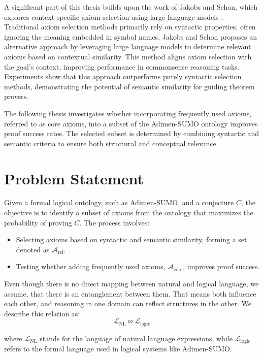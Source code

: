 \documentclass[english,version-2020-11]{uzl-thesis}
\begin{document}
A significant part of this thesis builds upon the work of Jakobs and Schon, which explores context-specific axiom selection using large language models \cite{Schon2024}. Traditional axiom selection methods primarily rely on syntactic properties, often ignoring the meaning embedded in symbol names. Jakobs and Schon proposes an alternative approach by leveraging large language models to determine relevant axioms based on contextual similarity. This method aligns axiom selection with the goal's context, improving performance in commonsense reasoning tasks. Experiments show that this approach outperforms purely syntactic selection methods, demonstrating the potential of semantic similarity for guiding theorem provers.

The following thesis investigates whether incorporating frequently used axioms, referred to as core axioms, into a subset of the Adimen-SUMO ontology improves proof success rates. The selected subset is determined by combining syntactic and semantic criteria to ensure both structural and conceptual relevance.

\section{Problem Statement}
Given a formal logical ontology, such as Adimen-SUMO, and a conjecture \( C \), the objective is to identify a subset of axioms from the ontology that maximizes the probability of proving \( C \). The process involves:
\begin{itemize}
    \item Selecting axioms based on syntactic and semantic similarity, forming a set denoted as \( \mathcal{A}_{\text{rel}} \).
    \item Testing whether adding frequently used axioms, \( \mathcal{A}_{\text{core}} \), improves proof success.
\end{itemize}

Even though there is no direct mapping between natural and logical language, we assume, that there is an entanglement between them. That means both influence each other, and reasoning in one domain can reflect structures in the other. We describe this relation as:\\
\begin{equation}
    \mathcal{L}_{\text{NL}} \bowtie \mathcal{L}_{\text{logic}}
\end{equation}

where \( \mathcal{L}_{\text{NL}} \) stands for the language of natural language expressions, while \( \mathcal{L}_{\text{logic}} \) refers to the formal language used in logical systems like Adimen-SUMO.
\end{document}
